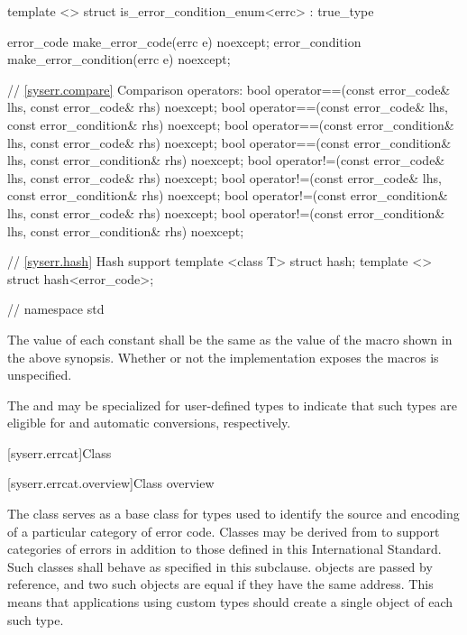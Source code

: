 \begin{codeblock}
{  template <> struct is_error_condition_enum<errc> : true_type { }

  error_code make_error_code(errc e) noexcept;
  error_condition make_error_condition(errc e) noexcept;

  // \ref{syserr.compare} Comparison operators:
  bool operator==(const error_code& lhs, const error_code& rhs) noexcept;
  bool operator==(const error_code& lhs, const error_condition& rhs) noexcept;
  bool operator==(const error_condition& lhs, const error_code& rhs) noexcept;
  bool operator==(const error_condition& lhs, const error_condition& rhs) noexcept;
  bool operator!=(const error_code& lhs, const error_code& rhs) noexcept;
  bool operator!=(const error_code& lhs, const error_condition& rhs) noexcept;
  bool operator!=(const error_condition& lhs, const error_code& rhs) noexcept;
  bool operator!=(const error_condition& lhs, const error_condition& rhs) noexcept;

  // \ref{syserr.hash} Hash support
  template <class T> struct hash;
  template <> struct hash<error_code>;
}  // namespace std
\end{codeblock}

\pnum The value of each  constant shall be the same as
the value of the  macro shown in the above synopsis. Whether
or not the  implementation exposes the 
macros is unspecified.

\pnum
The  and  may be
specialized for user-defined types to indicate that such types are eligible
for  and  automatic
conversions, respectively.

[syserr.errcat]{Class }

[syserr.errcat.overview]{Class  overview}

\pnum
The class  serves as a base class for types used
to identify the source and encoding of a particular category of error code.
Classes may be derived from  to support
categories of errors in addition to those defined in this International
Standard.
Such classes shall behave as specified in this
subclause. \enternote {} objects are
passed by reference, and two such objects
are equal if they have the same address. This means that applications using
custom  types should create a single object of each
such type. \exitnote

